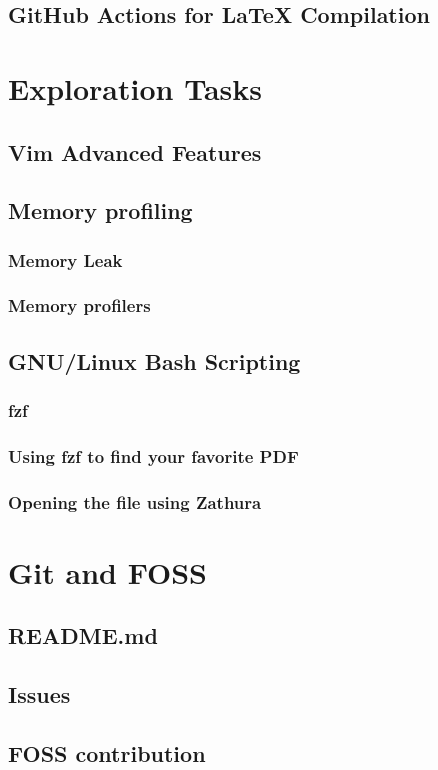 \documentclass[12pt]{article}
\begin{document}
    \subsection{GitHub Actions for LaTeX Compilation}

\section{Exploration Tasks}
    \subsection{Vim Advanced Features}
    
    \subsection{Memory profiling}
        \subsubsection{Memory Leak}
        \subsubsection{Memory profilers}

    \subsection{GNU/Linux Bash Scripting}
        \subsubsection{fzf}
        \subsubsection{Using fzf to find your favorite PDF}
        \subsubsection{Opening the file using Zathura}

\section{Git and FOSS}
    \subsection{README.md}
    \subsection{Issues}
    \subsection{FOSS contribution}
\end{document}
